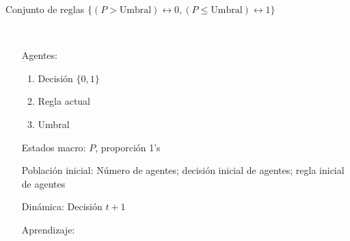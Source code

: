 \documentclass{minimal}
\begin{document}
Conjunto de reglas $\{(P>\mbox{Umbral})\leftrightarrow 0, (P\leq\mbox{Umbral})\leftrightarrow 1\}$

\

\begin{itemize}
\item[Agentes:] 

	\begin{enumerate}
	\item Decisión $\{0, 1\}$
	\item Regla actual
	\item Umbral
	\end{enumerate}

\item[Estados macro:] $P$, proporción 1's

\item[Población inicial:] Número de agentes; decisión inicial de agentes; regla inicial de agentes

\item[Dinámica:] Decisión $t+1$

\item[Aprendizaje:] 

\end{itemize}
\end{document}
